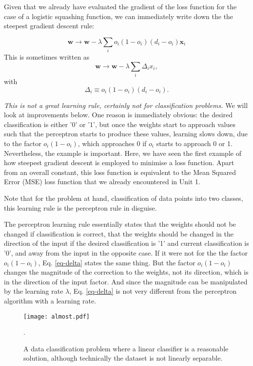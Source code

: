   Given that we already have evaluated the gradient of the loss function for the case of a logistic squashing function, we can immediately write down the
  the steepest gradient descent rule:

  \begin{equation}
    \boldsymbol{w} \rightarrow \boldsymbol{w} - \lambda \sum_i o_i(1-o_i)(d_i - o_i) \boldsymbol{x}_i
    \label{eq-delta}
  \end{equation}
  This is sometimes written as
  $$
  \boldsymbol{w} \rightarrow \boldsymbol{w} - \lambda \sum_i \Delta_i x_i,
  $$
  with
  $$
  \Delta_i \equiv o_i ( 1- o_i) (d_i - o_i).
  $$

  \emph{This is not a great learning rule, certainly not for classification problems.} We will look at improvements below.
  One reason is immediately obvious: the desired classification
  is either '0' or '1', but once the weights start to approach values such that the perceptron starts to produce these values, learning slows down,
  due to the factor $o_i(1 - o_i)$, which approaches 0 if $o_i$ starts to approach 0 or 1.  Nevertheless, the example is important.
  Here, we have seen the first example of how steepest gradient descent is employed to minimise a loss function. Apart from an overall constant, this loss
  function is equivalent to the  Mean Squared Error (MSE) loss function that we already encountered in Unit 1.

  Note that for the problem at hand, classification of data points into two classes, this learning rule is the perceptron rule in disguise. 
  
  The perceptron learning rule essentially states that the weights should not be changed if classification is correct, that the weights should be changed
  in the direction of the input if the desired classification is '1' and current classification is '0', and away from the input in the opposite case.
  If it were not for the the factor $o_i(1-o_i)$, Eq. \ref{eq-delta} states the same thing. But the factor $o_i(1 - o_i)$ changes the magnitude of the
  correction to the weights, not its direction, which is in the direction of the input factor. And since the magnitude can be manipulated by the
  learning rate $\lambda$,  Eq. \ref{eq-delta} is not very different from the perceptron algorithm with a learning rate.

  \begin{figure}
    \begin{center}
      \texttt{[image: almost.pdf]}
    \end{center}
    \caption{A data classification problem where a linear classifier is a reasonable solution, although technically the dataset is not linearly separable.}
    \label{fig-almost}.
  \end{figure}
  
